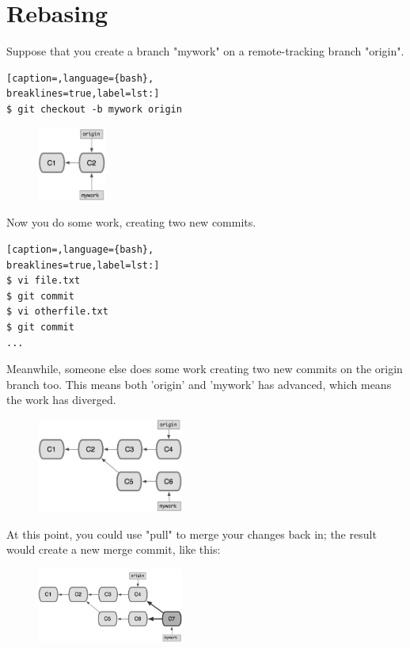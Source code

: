 \section{Rebasing}
Suppose that you create a branch "mywork" on a remote-tracking branch "origin".
\lstset{basicstyle=\scriptsize, numbers=none, captionpos=b, tabsize=4}
\begin{lstlisting}[caption=,language={bash},
breaklines=true,label=lst:]
$ git checkout -b mywork origin
\end{lstlisting}

\begin{figure}[h]
\centering
\includegraphics[width=0.20\textwidth]{content/git/rebase0.png}
\end{figure}

Now you do some work, creating two new commits.
\lstset{basicstyle=\scriptsize, numbers=none, captionpos=b, tabsize=4}
\begin{lstlisting}[caption=,language={bash},
breaklines=true,label=lst:]
$ vi file.txt
$ git commit
$ vi otherfile.txt
$ git commit
...
\end{lstlisting}

Meanwhile, someone else does some work creating two new commits on the origin
branch too. This means both 'origin' and 'mywork' has advanced, which means the
work has diverged.

\begin{figure}[h]
\centering
\includegraphics[width=0.43\textwidth]{content/git/rebase1.png}
\end{figure}

At this point, you could use "pull" to merge your changes back in; the result
would create a new merge commit, like this:

\begin{figure}[h]
\centering
\includegraphics[width=0.43\textwidth]{content/git/rebase2.png}
\end{figure}

